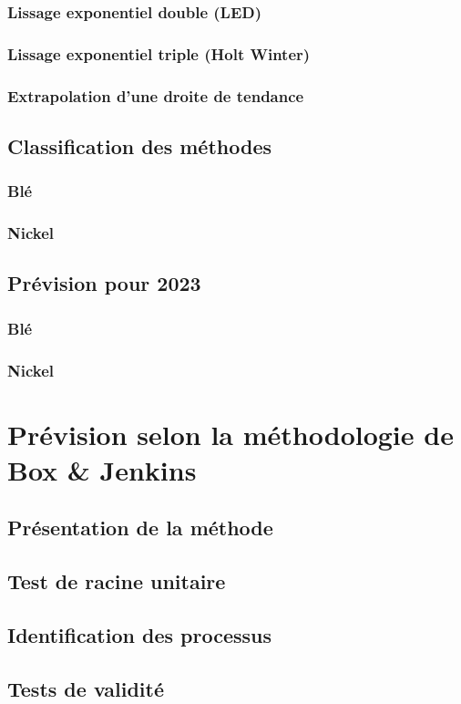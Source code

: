 \documentclass[11pt,a4paper]{article}
\begin{document}
\subsubsection{Lissage exponentiel double (LED)}
\subsubsection{Lissage exponentiel triple (Holt Winter)}
\subsubsection{Extrapolation d'une droite de tendance}
\subsection{Classification des méthodes}
\subsubsection{Blé}
\subsubsection{Nickel}
\subsection{Prévision pour 2023}
\subsubsection{Blé}
\subsubsection{Nickel}
\section{Prévision selon la méthodologie de Box \& Jenkins}
\subsection{Présentation de la méthode}
\subsection{Test de racine unitaire}
\subsection{Identification des processus}
\subsection{Tests de validité}
\end{document}
